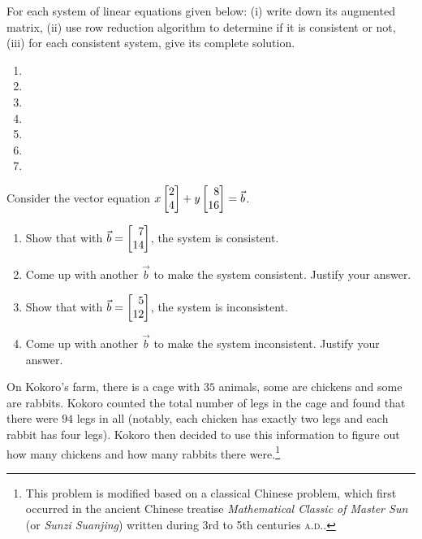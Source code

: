 \begin{exercises}
\begin{problist}
		\prob For each system of linear equations given below: (i) write down
		its augmented matrix, (ii) use row reduction algorithm to determine if it
		is consistent or not, (iii) for each consistent system, give its complete
		solution.
		\begin{enumerate}
			\item {}

			\item {}

			\item {}

			\item {}

			\item {}

			\item {}

			\item {}
		\end{enumerate}

		\prob Consider the vector equation $x\mat{2 \\ 4}+y\mat{8 \\ 16}=\vec b$.
		\begin{enumerate}
			\item Show that with $\vec b=\mat{7 \\ 14}$, the system is
				consistent.

			\item Come up with another $\vec b$ to make the system consistent.
				Justify your answer.

			\item Show that with $\vec b=\mat{5 \\ 12}$, the system is
				inconsistent.

			\item Come up with another $\vec b$ to make the system inconsistent.
				Justify your answer.
		\end{enumerate}

		\prob On Kokoro's farm, there is a cage with $35$ animals, some are chickens
		and some are rabbits. Kokoro counted the total number of legs in the
		cage and found that there were $94$ legs in all (notably, each chicken
		has exactly two legs and each rabbit has four legs). Kokoro then decided
		to use this information to figure out how many chickens and how many
		rabbits there were.\footnote{This problem is modified based on a
		classical Chinese problem, which first occurred in the ancient Chinese treatise
		\emph{Mathematical Classic of Master Sun} (or \emph{Sunzi Suanjing}) written
		during 3rd to 5th centuries \textsc{a.d.}.}


\end{problist}
\end{exercises}
